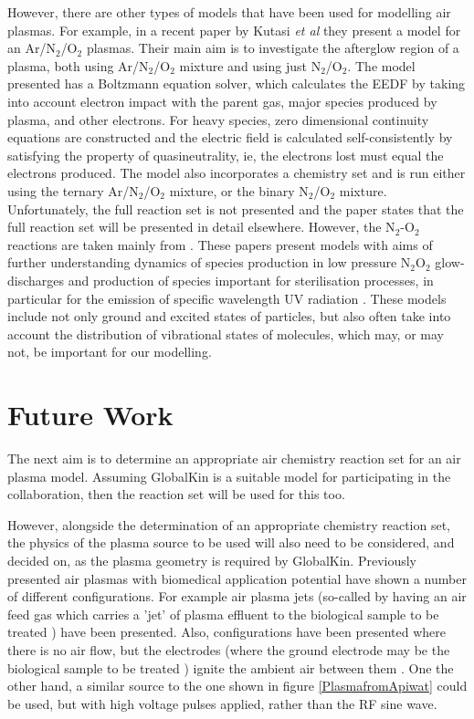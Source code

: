 \documentclass[11pt, oneside]{article}   	%
\begin{document}
However, there are other types of models that have been used for modelling air plasmas.
For example, in a recent paper by Kutasi \textit{et al} \cite{Kutasi2016tuning} they present a model for an Ar/N$_2$/O$_2$ plasmas.
Their main aim is to investigate the afterglow region of a plasma, both using Ar/N$_2$/O$_2$ mixture and using just N$_2$/O$_2$.
The model presented has a Boltzmann equation solver, which calculates the EEDF by taking into account electron impact with the parent gas, major species produced by plasma, and other electrons.
For heavy species, zero dimensional continuity equations are constructed and the electric field is calculated self-consistently by satisfying the property of quasineutrality, ie, the electrons lost must equal the electrons produced.
The model also incorporates a chemistry set and is run either using the ternary Ar/N$_2$/O$_2$ mixture, or the binary N$_2$/O$_2$ mixture.
Unfortunately, the full reaction set is not presented and the paper states that the full reaction set will be presented in detail elsewhere.
However, the N$_2$-O$_2$ reactions are taken mainly from \cite{Guerra1997self, Pintassilgo2005modelling, Kutasi2008modelling}.
These papers present models with aims of further understanding dynamics of species production in low pressure N$_2$O$_2$ glow-discharges \cite{Guerra1997self} and production of species important for sterilisation processes, in particular for the emission of specific wavelength UV radiation \cite{Pintassilgo2005modelling, Kutasi2008modelling}.
These models include not only ground and excited states of particles, but also often take into account the distribution of vibrational states of molecules, which may, or may not, be important for our modelling.


\section{Future Work}

The next aim is to determine an appropriate air chemistry reaction set for an air plasma model.
Assuming GlobalKin is a suitable model for participating in the collaboration, then the reaction set will be used for this too.

However, alongside the determination of an appropriate chemistry reaction set, the physics of the plasma source to be used will also need to be considered, and decided on, as the plasma geometry is required by GlobalKin.
Previously presented air plasmas with biomedical application potential have shown a number of different configurations.
For example air plasma jets (so-called by having an air feed gas which carries a 'jet' of plasma effluent to the biological sample to be treated \cite{Kolb2008cold, Chen2009blood}) have been presented.
Also, configurations have been presented where there is no air flow, but the electrodes (where the ground electrode may be the biological sample to be treated \cite{Fridman2007floating}) ignite the ambient air between them \cite{Laroussi2004evaluation}. 
One the other hand, a similar source to the one shown in figure \ref{PlasmafromApiwat} could be used, but with high voltage pulses applied, rather than the RF sine wave.
\end{document}
